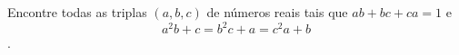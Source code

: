 Encontre todas as triplas $(a, b, c)$ de números reais tais que $ab + bc + ca = 1$ e $$a^2b+c=b^2c+a=c^2a+b$$.
